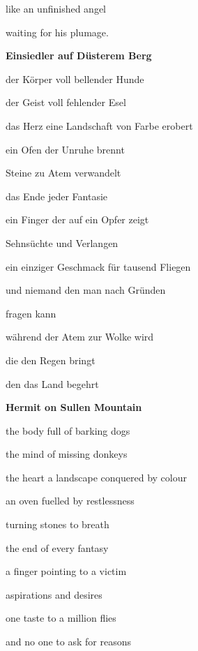 \documentclass[a4paper]{article}
\begin{document}
like an unfinished angel 

waiting for his plumage.


\bigskip

{\bfseries
Einsiedler auf Düsterem Berg}


\bigskip


\bigskip

der Körper voll bellender Hunde

der Geist voll fehlender Esel


\bigskip

das Herz eine Landschaft von Farbe erobert

ein Ofen der Unruhe brennt

Steine zu Atem verwandelt 


\bigskip

das Ende jeder Fantasie

ein Finger der auf ein Opfer zeigt


\bigskip

Sehnsüchte und Verlangen

ein einziger Geschmack für tausend Fliegen

und niemand den man nach Gründen 

fragen kann


\bigskip

während der Atem zur Wolke wird

die den Regen bringt

den das Land begehrt 

\clearpage
\bigskip

{\bfseries
Hermit on Sullen Mountain}


\bigskip


\bigskip

the body full of barking dogs

the mind of missing donkeys


\bigskip

the heart a landscape conquered by colour

an oven fuelled by restlessness

turning stones to breath


\bigskip

the end of every fantasy

a finger pointing to a victim


\bigskip

aspirations and desires

one taste to a million flies

and no one to ask for reasons
\end{document}
